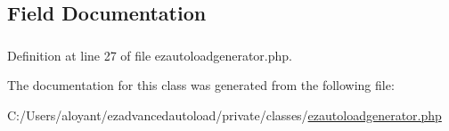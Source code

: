 \subsection{Field Documentation}
\hypertarget{classextension_1_1ezadvancedautoload_1_1pv_1_1classes_1_1e_z_autoload_generator_abe431f515e0a071f1ca74fd276813c19}{
\subsubsection[{\$active\-Extensions}]{}}\label{classextension_1_1ezadvancedautoload_1_1pv_1_1classes_1_1e_z_autoload_generator_abe431f515e0a071f1ca74fd276813c19}


Definition at line 27 of file ezautoloadgenerator.\-php.



The documentation for this class was generated from the following file\-:\begin{DoxyCompactItemize}
\item 
C\-:/\-Users/aloyant/ezadvancedautoload/private/classes/\hyperlink{ezautoloadgenerator_8php}{ezautoloadgenerator.\-php}\end{DoxyCompactItemize}
